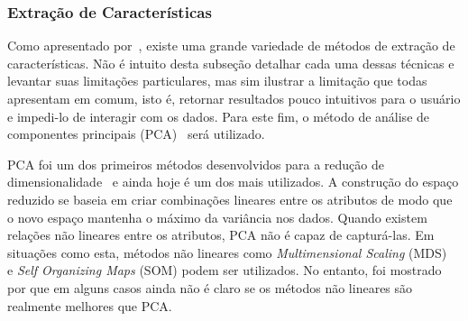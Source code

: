 \subsubsection{Extração de Características}

Como apresentado por~\cite{Maaten2009}, existe uma grande
variedade de métodos de extração de características. Não é
intuito desta subseção detalhar cada uma dessas técnicas e
levantar suas limitações particulares, mas sim ilustrar a
limitação que todas apresentam em comum, isto é, retornar
resultados pouco intuitivos para o usuário e impedi-lo de
interagir com os dados. Para este fim, o método de análise
de componentes principais (PCA)~\cite{Joll2002} será
utilizado.

PCA foi um dos primeiros métodos desenvolvidos para a
redução de dimensionalidade~\cite{Pearson1901} e ainda hoje
é um dos mais utilizados. A construção do espaço reduzido se
baseia em criar combinações lineares entre os atributos de
modo que o novo espaço mantenha o máximo da variância nos
dados. Quando existem relações não lineares entre os
atributos, PCA não é capaz de capturá-las. Em situações como
esta, métodos não lineares como  \textit{Multimensional
Scaling} (MDS)~\cite{Cox2002} e \textit{Self Organizing
Maps} (SOM)\cite{Kohonen1990} podem ser utilizados. No
entanto, foi mostrado por \cite{Maaten2009} que em alguns
casos ainda não é claro se os métodos não lineares são
realmente melhores que PCA.

